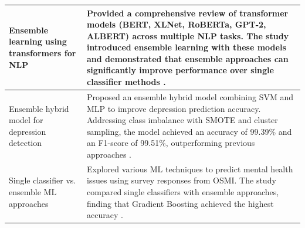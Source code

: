 \begin{table}[H]
\begin{tabularx}{\textwidth}{|p{3.5cm}|X|}
    Ensemble learning using transformers for NLP & Provided a comprehensive review of transformer models (BERT, XLNet, RoBERTa, GPT-2, ALBERT) across multiple NLP tasks. The study introduced ensemble learning with these models and demonstrated that ensemble approaches can significantly improve performance over single classifier methods \cite{Zhang_2024}. \\ \hline
    Ensemble hybrid model for depression detection & Proposed an ensemble hybrid model combining SVM and MLP to improve depression prediction accuracy. Addressing class imbalance with SMOTE and cluster sampling, the model achieved an accuracy of 99.39\% and an F1-score of 99.51\%, outperforming previous approaches \cite{Saha2024}. \\ \hline
    Single classifier vs. ensemble ML \newline approaches & Explored various ML techniques to predict mental health issues using survey responses from OSMI. The study compared single classifiers with ensemble approaches, finding that Gradient Boosting achieved the highest accuracy \cite{Chung_2023}. 
    \\ \hline
\end{tabularx}
\end{table}



